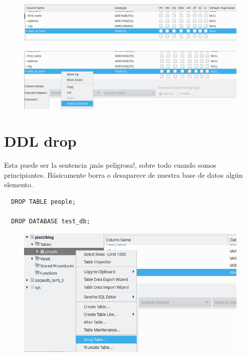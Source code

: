 \documentclass{article}
\begin{document}
\begin{figure}[h!]
  \centering
  \includegraphics[scale=0.55]{./Pictures/057_alter_tipo.png}
\end{figure}

\begin{figure}[h!]
  \centering
  \includegraphics[scale=0.55]{./Pictures/057_drop_column.png}
\end{figure}


\section{DDL drop}%
Esta puede ser la sentencia ¡más peligrosa!, sobre todo cuando somos
principiantes. Básicamente borra o desaparece de nuestra base de datos algún
elemento.

\begin{verbatim}
  DROP TABLE people;

  DROP DATABASE test_db;
\end{verbatim}

\begin{figure}[h!]
  \centering
  \includegraphics[scale=0.75]{./Pictures/058_drop_table.png}
\end{figure}
\end{document}

